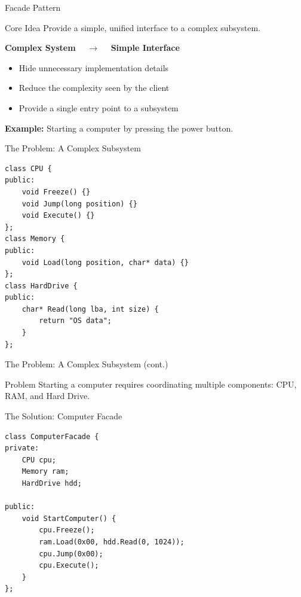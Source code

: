 \documentclass[aspectratio=169]{beamer}
\begin{document}
\begin{frame}{Facade Pattern}

    \begin{block}{Core Idea}
        Provide a simple, unified interface to a complex subsystem.
    \end{block}

    \begin{center}
        \Large
        \textbf{Complex System}
        $\quad\longrightarrow\quad$
        \textbf{Simple Interface}
    \end{center}

    \begin{itemize}
        \item Hide unnecessary implementation details
        \item Reduce the complexity seen by the client
        \item Provide a single entry point to a subsystem
    \end{itemize}

    \textbf{Example:} Starting a computer by pressing the power button.
\end{frame}

\begin{frame}[fragile]{The Problem: A Complex Subsystem}

\begin{lstlisting}
class CPU {
public:
    void Freeze() {}
    void Jump(long position) {}
    void Execute() {}
};
class Memory {
public:
    void Load(long position, char* data) {}
};
class HardDrive {
public:
    char* Read(long lba, int size) {
        return "OS data";
    }
};
\end{lstlisting}
\end{frame}

\begin{frame}{The Problem: A Complex Subsystem (cont.)}
\begin{block}{Problem}
    Starting a computer requires coordinating multiple components:
    CPU, RAM, and Hard Drive.
\end{block}

\end{frame}

\begin{frame}[fragile]{The Solution: Computer Facade}

\begin{lstlisting}
class ComputerFacade {
private:
    CPU cpu;
    Memory ram;
    HardDrive hdd;

public:
    void StartComputer() {
        cpu.Freeze();
        ram.Load(0x00, hdd.Read(0, 1024));
        cpu.Jump(0x00);
        cpu.Execute();
    }
};
\end{lstlisting}
\end{frame}
\end{document}
